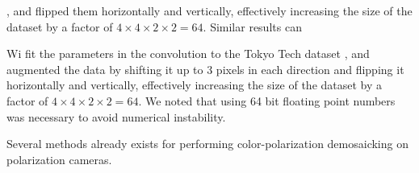 , and flipped them horizontally and vertically, effectively increasing the size of the dataset by a factor of $4\times4\times2\times2 =64$.
Similar results can


Wi fit the parameters in the convolution to the Tokyo Tech dataset \cite{morimatsuMonochromeColorPolarization2020}\cite{morimatsuMonochromeColorPolarization2021}, and augmented the data by shifting it up to 3 pixels in each direction and flipping it horizontally and vertically, effectively increasing the size of the dataset by a factor of $4\times4\times2\times2 =64$.
We noted that using 64 bit floating point numbers was necessary to avoid numerical instability.

Several methods already exists for performing color-polarization demosaicking on polarization cameras\cite{morimatsuMonochromeColorPolarization2020}\cite{morimatsuMonochromeColorPolarization2021}\cite{nguyenTwoStepColorPolarizationDemosaicking2022a}.





